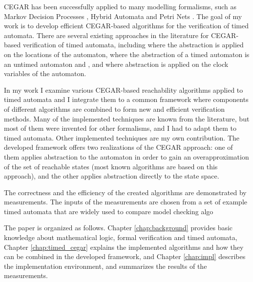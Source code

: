 CEGAR \cite{clarke2003counterexample} has been successfully applied to many modelling formalisms, such as Markov Decision Processes \cite{kwiatkowska2006game}, Hybrid Automata \cite{journals/fmsd/PrabhakarDM015} and Petri Nets \cite{journals/actaC/HajduVBM14}. The goal of my work is to develop efficient CEGAR-based algorithms for the verification of timed automata. There are several existing approaches in the literature for CEGAR-based verification of timed automata, including \cite{kemper2007sat} where the abstraction is applied on the locations of the automaton, \cite{nagaoka2010abstraction} where the abstraction of a timed automaton is an untimed
automaton and \cite{dierks2007automatic, he2010compositional}, and \cite{okano2011clock} where abstraction is applied on the clock variables of the automaton.

In my work I examine various CEGAR-based reachability algorithms applied to timed automata and I integrate them to a common framework where components of different algorithms are combined to form new and efficient verification methods. Many of the implemented techniques are known from the literature, but most of them were invented for other formalisms, and I had to adapt them to timed automata. Other implemented techniques are my own contribution. The developed framework offers two realizations of the CEGAR approach: one of them applies abstraction to the automaton in order to gain an overapproximation of the set of reachable states (most known algorithms are based on this approach), and the other applies abstraction directly to the state space. 

The correctness and the efficiency %
of the created algorithms are demonstrated by measurements. The inputs of the measurements are chosen from a set of example timed automata that are widely used to compare model checking algo

The paper is organized as follows. Chapter \ref{chap:background} provides basic knowledge about mathematical logic, formal verification and timed automata, Chapter \ref{chap:timed_cegar} explains the implemented algorithms and how they can be combined in the developed framework, and Chapter \ref{chap:impl} describes the implementation environment, and summarizes the results of the measurements.

 


